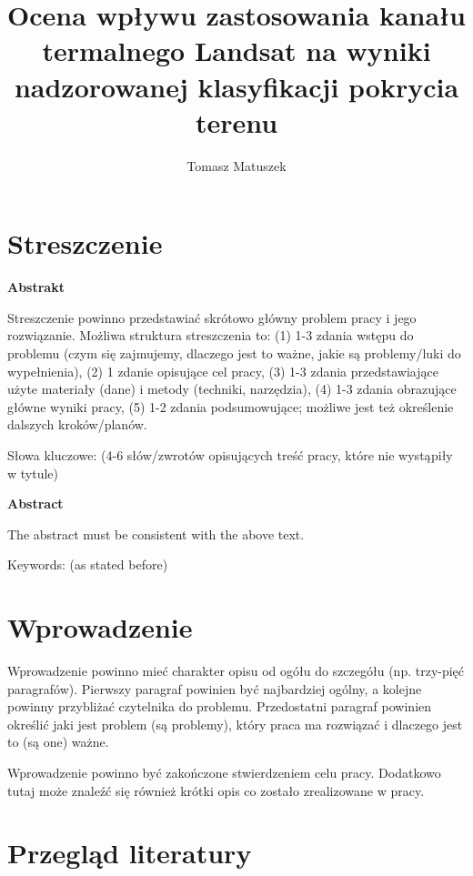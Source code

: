 \documentclass{amuthesis}
\author{Tomasz Matuszek}
\title{Ocena wpływu zastosowania kanału termalnego Landsat na wyniki
nadzorowanej klasyfikacji pokrycia terenu}
\begin{document}

\titlepage


\hypertarget{streszczenie}{%
\chapter*{Streszczenie}\label{streszczenie}}

\textbf{Abstrakt}

Streszczenie powinno przedstawiać skrótowo główny problem pracy i jego
rozwiązanie. Możliwa struktura streszczenia to: (1) 1-3 zdania wstępu do
problemu (czym się zajmujemy, dlaczego jest to ważne, jakie są
problemy/luki do wypełnienia), (2) 1 zdanie opisujące cel pracy, (3) 1-3
zdania przedstawiające użyte materiały (dane) i metody (techniki,
narzędzia), (4) 1-3 zdania obrazujące główne wyniki pracy, (5) 1-2
zdania podsumowujące; możliwe jest też określenie dalszych
kroków/planów.

Słowa kluczowe: (4-6 słów/zwrotów opisujących treść pracy, które nie
wystąpiły w tytule)

\textbf{Abstract}

The abstract must be consistent with the above text.

Keywords: (as stated before)

\newpage

\sf\tighttoc\doublespacing


\hypertarget{sec-wprowadzenie}{%
\chapter{Wprowadzenie}\label{sec-wprowadzenie}}

Wprowadzenie powinno mieć charakter opisu od ogółu do szczegółu (np.
trzy-pięć paragrafów). Pierwszy paragraf powinien być najbardziej
ogólny, a kolejne powinny przybliżać czytelnika do problemu.
Przedostatni paragraf powinien określić jaki jest problem (są problemy),
który praca ma rozwiązać i dlaczego jest to (są one) ważne.

Wprowadzenie powinno być zakończone stwierdzeniem celu pracy. Dodatkowo
tutaj może znaleźć się również krótki opis co zostało zrealizowane w
pracy.


\hypertarget{sec-lit}{%
\chapter{Przegląd literatury}\label{sec-lit}}
\end{document}
